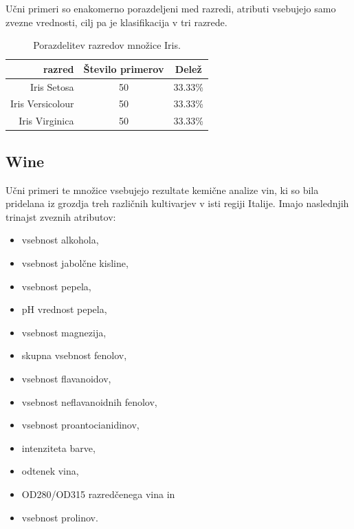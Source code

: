 \documentclass[a4paper,12pt,openright]{book}
\begin{document}
    Učni primeri so enakomerno porazdeljeni med razredi, atributi vsebujejo samo zvezne vrednosti, cilj pa je klasifikacija v tri razrede.

    \begin{table}[H]
        \centering
        \begin{tabular}{||rcc||}
            \hline
            razred           & Število primerov & Delež   \\ \hline
            Iris Setosa      & 50               & 33.33\% \\ \hline
            Iris Versicolour & 50               & 33.33\% \\ \hline
            Iris Virginica   & 50               & 33.33\% \\ \hline
        \end{tabular}
        \caption{Porazdelitev razredov množice Iris.}
        \label{tab:iris_opis}
    \end{table}

    \newpage
    \subsection{Wine}\label{subsec:wine}
    Učni primeri te množice vsebujejo rezultate kemične analize vin, ki so bila pridelana iz grozdja
    treh različnih kultivarjev v isti regiji Italije.
    Imajo naslednjih trinajst zveznih atributov:
    \begin{itemize}
        \item vsebnost alkohola,
        \item vsebnost jabolčne kisline,
        \item vsebnost pepela,
        \item pH vrednost pepela,
        \item vsebnost magnezija,
        \item skupna vsebnost fenolov,
        \item vsebnost flavanoidov,
        \item vsebnost neflavanoidnih fenolov,
        \item vsebnost proantocianidinov,
        \item intenziteta barve,
        \item odtenek vina,
        \item OD280/OD315 razredčenega vina in
        \item vsebnost prolinov.
    \end{itemize}
\end{document}
